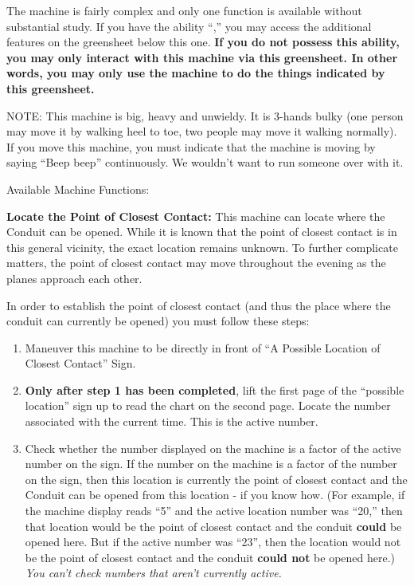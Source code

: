 \documentclass[green]{elementals}
\begin{document}
\name{\gConduitCover{}}


The machine is fairly complex and only one function is available without substantial study. If you have the ability ``\aWorkConduit{},'' you may access the additional features on the greensheet below this one. {\bf If you do not possess this ability, you may only interact with this machine via this greensheet. In other words, you may only use the machine to do the things indicated by this greensheet.}

NOTE: This machine is big, heavy and unwieldy. It is 3-hands bulky (one person may move it by walking heel to toe, two people may move it walking normally). If you move this machine, you must indicate that the machine is moving by saying ``Beep beep'' continuously. We wouldn't want to run someone over with it.


{\large Available Machine Functions:}


{\bf Locate the Point of Closest Contact:}
This machine can locate where the Conduit can be opened. While it is known that the point of closest contact is in this general vicinity, the exact location remains unknown. To further complicate matters, the point of closest contact may move throughout the evening as the planes approach each other.

In order to establish the point of closest contact (and thus the place where the conduit can currently be opened) you must follow these steps:
\begin{enumerate}
  \item Maneuver this machine to be directly in front of ``A Possible Location of Closest Contact'' Sign.
  \item {\bf Only after step 1 has been completed}, lift the first page of the ``possible location'' sign up to read the chart on the second page. Locate the number associated with the current time. This is the active number.
  \item Check whether the number displayed on the machine is a factor of the active number on the sign. If the number on the machine is a factor of the number on the sign, then this location is currently the point of closest contact and the Conduit can be opened from this location - if you know how. (For example, if the machine display reads ``5'' and the active location number was ``20,'' then that location would be the point of closest contact and the conduit {\bf could} be opened here. But if the active number was ``23'', then the location would not be the point of closest contact and the conduit {\bf could not} be opened here.) \emph{You can't check numbers that aren't currently active.} 
\end{enumerate}
\end{document}
